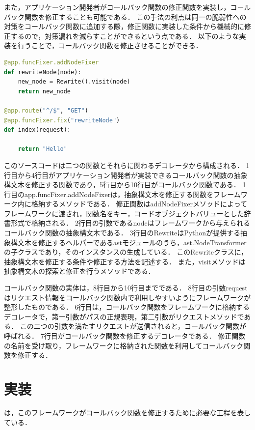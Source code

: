 \documentclass[submit]{ipsj}
\begin{document}
また，アプリケーション開発者がコールバック関数の修正関数を実装し，コールバック関数を修正することも可能である．
この手法の利点は同一の脆弱性への対策をコールバック関数に追加する際，修正関数に実装した条件から機械的に修正するので，対策漏れを減らすことができるという点である．
以下のような実装を行うことで，コールバック関数を修正させることができる．
\begin{lstlisting}[language=python]
@app.funcFixer.addNodeFixer
def rewriteNode(node):
    new_node = Rewrite().visit(node)
    return new_node

@app.route("^/$", "GET")
@app.funcFixer.fix("rewriteNode")
def index(request):

    return "Hello"
\end{lstlisting}
このソースコードは二つの関数とそれらに関わるデコレータから構成される．
1行目から4行目がアプリケーション開発者が実装できるコールバック関数の抽象構文木を修正する関数であり，5行目から10行目がコールバック関数である．
1行目のapp.funcFixer.addNodeFixerは，抽象構文木を修正する関数をフレームワーク内に格納するメソッドである．
修正関数はaddNodeFixerメソッドによってフレームワークに渡され，関数名をキー，コードオブジェクトバリューとした辞書形式で格納される．
2行目の引数であるnodeはフレームワークから与えられるコールバック関数の抽象構文木である．
3行目のRewriteはPythonが提供する抽象構文木を修正するヘルパーであるast\cite{AST}モジュールのうち，ast.NodeTransformerの子クラスであり，そのインスタンスの生成している．
このRewriteクラスに，抽象構文木を修正する条件や修正する方法を記述する．
また，visitメソッドは抽象構文木の探索と修正を行うメソッドである．

コールバック関数の実体は，8行目から10行目までである．
8行目の引数requestはリクエスト情報をコールバック関数内で利用しやすいようにフレームワークが整形したものである．
6行目は，コールバック関数をフレームワークに格納するデコレータで，第一引数がパスの正規表現，第二引数がリクエストメソッドである．
この二つの引数を満たすリクエストが送信されると，コールバック関数が呼ばれる．
7行目がコールバック関数を修正するデコレータである．
修正関数の名前を受け取り，フレームワークに格納された関数を利用してコールバック関数を修正する．

\section{実装}
は，このフレームワークがコールバック関数を修正するために必要な工程を表している．
\end{document}
